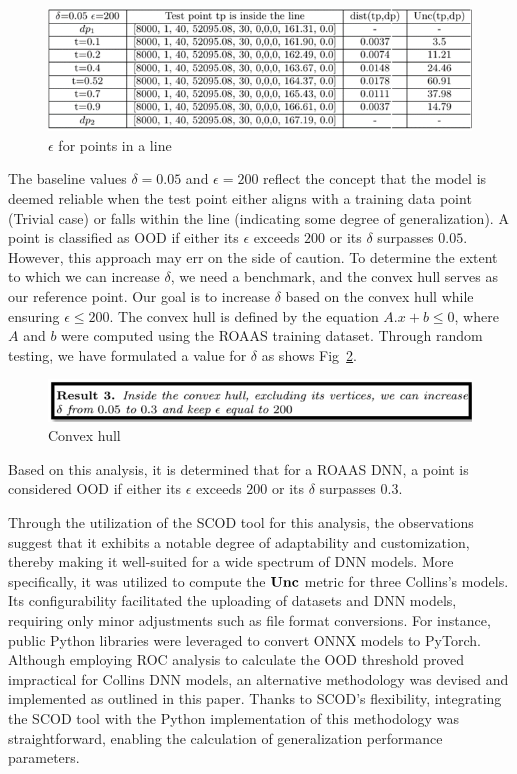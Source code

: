 \begin{figure}[ht]
\centering
\includegraphics[scale=0.65]{Fig/OOD_result1Exa.png}
\caption{$\epsilon$ for points in a line}
\label{fig:line}
\end{figure}
The baseline values $\delta=0.05$ and $\epsilon=200$ reflect the concept that the model is deemed reliable when the test point either aligns with a training data point (Trivial case) or falls within the line (indicating some degree of generalization). A point is classified as OOD if either its $\epsilon$ exceeds $200$ or its $\delta$ surpasses $0.05$. However, this approach may err on the side of caution. To determine the extent to which we can increase $\delta$, we need a benchmark, and the convex hull serves as our reference point. Our goal is to increase $\delta$ based on the convex hull while ensuring $\epsilon \leq 200$. The convex hull is defined by the equation $A.x+b\leq 0$, where $A$ and $b$ were computed using the ROAAS training dataset. Through random testing, we have formulated a value for $\delta$ as shows Fig~\ref{fig:ConHull}. 
\begin{figure}[ht]
\centering
\includegraphics[scale=0.65]{Fig/OOD_result3.png}
\caption{Convex hull}
\label{fig:ConHull}
\end{figure}
Based on this analysis, it is determined that for a ROAAS DNN, a point is considered OOD if either its $\epsilon$ exceeds $200$ or its $\delta$ surpasses $0.3$.



Through the utilization of the SCOD tool for this analysis, the observations suggest that it exhibits a notable degree of adaptability and customization, thereby making it well-suited for a wide spectrum of DNN models. More specifically, it was utilized to compute the $\bf{Unc}$ metric for three Collins's models. Its configurability facilitated the uploading of datasets and DNN models, requiring only minor adjustments such as file format conversions. For instance, public Python libraries were leveraged to convert ONNX models to PyTorch. Although employing ROC analysis to calculate the OOD threshold proved impractical for Collins DNN models, an alternative methodology was devised and implemented as outlined in this paper. Thanks to SCOD's flexibility, integrating the SCOD tool with the Python implementation of this methodology was straightforward, enabling the calculation of generalization performance parameters.